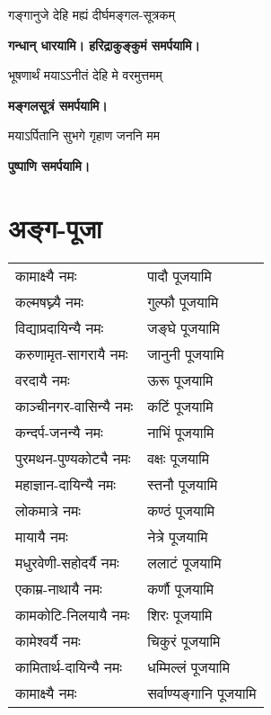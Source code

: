 \begin{center}
{गङ्गानुजे देहि मह्यं दीर्घमङ्गल-सूत्रकम्}

\textbf{\devAya{} गन्धान् धारयामि। हरिद्राकुङ्कुमं समर्पयामि।}
\medskip

{भूषणार्थं मयाऽऽनीतं देहि मे वरमुत्तमम्}

\textbf{\devAya{} मङ्गलसूत्रं समर्पयामि।}
\medskip

{मयाऽर्पितानि सुभगे गृहाण जननि मम}

\textbf{\devAya{} पुष्पाणि समर्पयामि।}
\medskip

\end{center}

\section{अङ्ग-पूजा}

\begin{tabular}{ll}
कामाक्ष्यै नमः & पादौ पूजयामि\\
कल्मषघ्न्यै नमः &  गुल्फौ पूजयामि\\
विद्याप्रदायिन्यै नमः & जङ्घे पूजयामि\\
करुणामृत-सागरायै नमः & जानुनी पूजयामि\\
वरदायै नमः & ऊरू पूजयामि\\
काञ्चीनगर-वासिन्यै नमः & कटिं पूजयामि\\
कन्दर्प-जनन्यै नमः & नाभिं पूजयामि\\
पुरमथन-पुण्यकोट्यै नमः&  वक्षः पूजयामि\\
महाज्ञान-दायिन्यै नमः & स्तनौ पूजयामि\\
लोकमात्रे नमः & कण्ठं पूजयामि\\
मायायै नमः & नेत्रे पूजयामि\\
मधुरवेणी-सहोदर्यै नमः & ललाटं पूजयामि\\
एकाम्र-नाथायै नमः & कर्णौ पूजयामि\\
कामकोटि-निलयायै नमः & शिरः पूजयामि\\
कामेश्वर्यै नमः & चिकुरं पूजयामि\\
कामितार्थ-दायिन्यै नमः & धम्मिल्लं पूजयामि\\
कामाक्ष्यै नमः & सर्वाण्यङ्गानि पूजयामि\\
\end{tabular}


